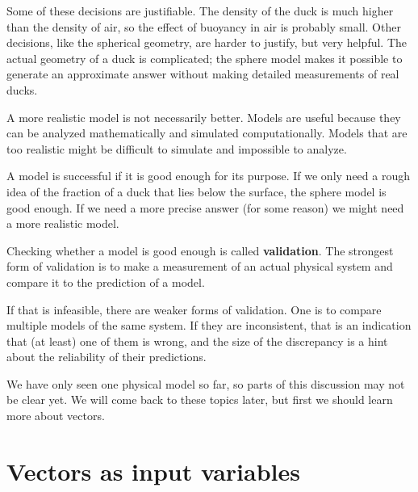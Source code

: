 \documentclass{book}
\begin{document}
Some of these decisions are justifiable.  The density of the duck
is much higher than the density of air, so the effect of buoyancy
in air is probably small.  Other decisions, like the spherical
geometry, are harder to justify, but very helpful.  The actual
geometry of a duck is complicated; the sphere model makes it possible
to generate an approximate answer without making detailed measurements
of real ducks.

A more realistic model is not necessarily better.  Models are useful
because they can be analyzed mathematically and simulated
computationally.  Models that are too realistic might be difficult to
simulate and impossible to analyze.

A model is successful if it is good enough for its purpose.  If we
only need a rough idea of the fraction of a duck that lies below
the surface, the sphere model is good enough.  If we need a more
precise answer (for some reason) we might need a more realistic
model.



Checking whether a model is good enough is called {\bf validation}.
The strongest form of validation is to make a measurement of an
actual physical system and compare it to the prediction of a
model.

If that is infeasible, there are weaker forms of validation.  One is
to compare multiple models of the same system.  If they are
inconsistent, that is an indication that (at least) one of them is
wrong, and the size of the discrepancy is a hint about the reliability
of their predictions.

We have only seen one physical model so far, so parts of this
discussion may not be clear yet.  We will come back to these topics
later, but first we should learn more about vectors.



\section{Vectors as input variables}
\end{document}
